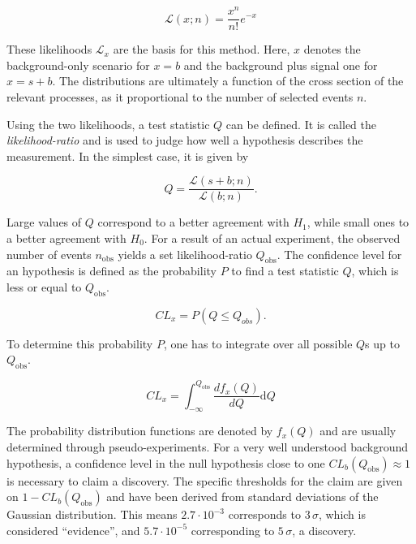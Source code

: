 \begin{equation}
  \label{eq:poisson-likelihood}
    \mathcal{L} (x; n) = \frac{x^n}{n!} e^{-x}
\end{equation}

\noindent These likelihoods $\mathcal{L}_x$ are the basis for this method. Here, $x$ denotes the background-only scenario for $x = b$ and the background plus signal one for $x = s + b$. The distributions are ultimately a function of the cross section of the relevant processes, as it proportional to the number of selected events $n$.

Using the two likelihoods, a test statistic $Q$ can be defined. It is called the \textit{likelihood-ratio} and is used to judge how well a hypothesis describes the measurement. In the simplest case, it is given by

\begin{equation}
  \label{eq:testq}
  Q = \frac{\mathcal{L} (s + b; n)}{\mathcal{L} (b; n)}.
\end{equation}

\noindent Large values of $Q$ correspond to a better agreement with $H_1$, while small ones to a better agreement with $H_0$. For a result of an actual experiment, the observed number of events $n_{\text{obs}}$ yields a set likelihood-ratio $Q_{\text{obs}}$. The confidence level for an hypothesis is defined as the probability $P$ to find a test statistic $Q$, which is less or equal to $Q_{\text{obs}}$. 

\begin{equation}
  \label{eq:cl-prob}
  CL_x = P (Q \leq Q_{obs}).
\end{equation}

To determine this probability $P$, one has to integrate over all possible $Q$s up to $Q_{\text{obs}}$.

\begin{equation}
  \label{eq:clx}
  CL_x = \int^{Q_{\text{obs}}}_{-\infty} \frac{d f_x(Q)}{d Q} \text{d} Q
\end{equation}

\noindent The probability distribution functions are denoted by $f_x(Q)$ and are usually determined through pseudo-experiments. For a very well understood background hypothesis, a confidence level in the null hypothesis close to one $CL_b (Q_{\text{obs}}) \approx 1$ is necessary to claim a discovery. The specific thresholds for the claim are given on $1 - CL_b (Q_{\text{obs}})$ and have been derived from standard deviations of the Gaussian distribution. This means $2.7 \cdot 10^{-3}$ corresponds to $3\,\sigma$, which is considered ``evidence'', and $5.7 \cdot 10^{-5}$ corresponding to $5\,\sigma$, a discovery.

